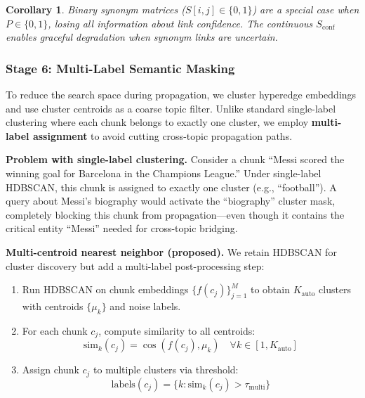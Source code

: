 \documentclass[11pt,a4paper]{article}
\newtheorem{corollary}{Corollary}
\begin{document}
\begin{corollary}
Binary synonym matrices ($S[i,j] \in \{0, 1\}$) are a special case when $P \in \{0, 1\}$, losing all information about link confidence. The continuous $S_{\text{conf}}$ enables graceful degradation when synonym links are uncertain.
\end{corollary}

\subsubsection{Stage 6: Multi-Label Semantic Masking}
\label{sec:masking}

To reduce the search space during propagation, we cluster hyperedge embeddings and use cluster centroids as a coarse topic filter. Unlike standard single-label clustering where each chunk belongs to exactly one cluster, we employ \textbf{multi-label assignment} to avoid cutting cross-topic propagation paths.

\textbf{Problem with single-label clustering.} Consider a chunk ``Messi scored the winning goal for Barcelona in the Champions League.'' Under single-label HDBSCAN, this chunk is assigned to exactly one cluster (e.g., ``football''). A query about Messi's biography would activate the ``biography'' cluster mask, completely blocking this chunk from propagation---even though it contains the critical entity ``Messi'' needed for cross-topic bridging.

\textbf{Multi-centroid nearest neighbor (proposed).} We retain HDBSCAN for cluster discovery but add a multi-label post-processing step:

\begin{enumerate}[leftmargin=*]
    \item Run HDBSCAN on chunk embeddings $\{f(c_j)\}_{j=1}^M$ to obtain $K_{\text{auto}}$ clusters with centroids $\{\mu_k\}$ and noise labels.
    \item For each chunk $c_j$, compute similarity to all centroids:
    \begin{equation}
        \text{sim}_k(c_j) = \cos(f(c_j), \mu_k) \quad \forall k \in [1, K_{\text{auto}}]
    \end{equation}
    \item Assign chunk $c_j$ to multiple clusters via threshold:
    \begin{equation}
        \text{labels}(c_j) = \{k : \text{sim}_k(c_j) > \tau_{\text{multi}}\}
    \end{equation}
\end{enumerate}
\end{document}
